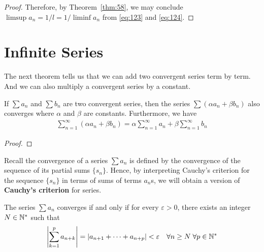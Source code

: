 \documentclass[thmcnt=section, 12pt]{my-elegantbook}
\begin{document}
\begin{proof}
    Therefore, by Theorem~\ref{thm:58}, we may conclude $\limsup a_n = 1 / l = 1 / \liminf a_n$ from \eqref{eq:123} and \eqref{eq:124}.
\end{proof}


\section{Infinite Series}


The next theorem tells us that we can add two convergent series term by term. And we can also multiply a convergent series by a constant.

\begin{theorem} \label{thm:48}
    If $\sum a_n$ and $\sum b_n$ are two convergent series, then the series $\sum (\alpha a_n + \beta b_n)$ also converges where $\alpha$ and $\beta$ are constants. Furthermore, we have 
    \begin{align*}
        \sum_{n=1}^\infty (\alpha a_n + \beta b_n)
        = \alpha \sum_{n=1}^\infty a_n 
        + \beta \sum_{n=1}^\infty b_n
    \end{align*}
\end{theorem}

\begin{proof}
\end{proof}


Recall the convergence of a series $\sum a_n$ is defined by the convergence of the sequence of its partial sums $\{s_n\}$. Hence, by interpreting Cauchy's criterion for the sequence $\{s_n\}$ in terms of sums of terms $a_n$s, we will obtain a version of \textbf{Cauchy's criterion} for series.

\begin{theorem} \label{thm:53}
    The series $\sum a_n$ converges if and only if for every $\varepsilon > 0$, there exists an integer $N \in \mathbb{N}^\ast$ such that 
    \begin{align*}
        \left\lvert \sum_{k=1}^p a_{n+k} \right\rvert 
        = \left\lvert a_{n+1} + \cdots + a_{n+p} \right\rvert
        < \varepsilon
        \quad
        \forall n \geq N \; 
        \forall p \in \mathbb{N}^\ast
    \end{align*}
\end{theorem}
\end{document}

